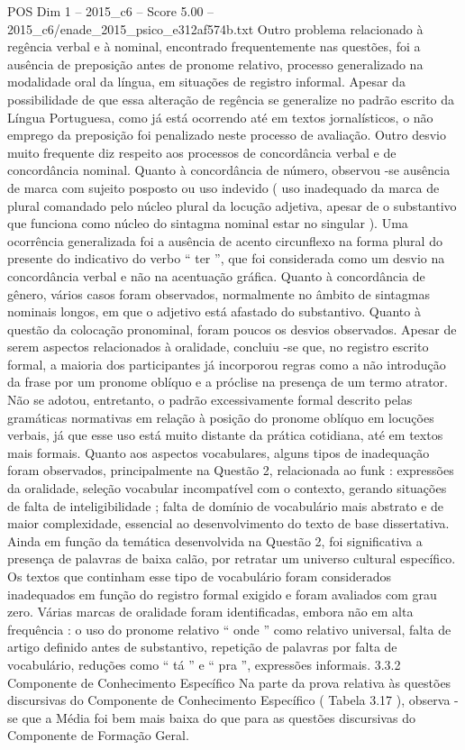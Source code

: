 \begin{textsample}{POS Dim 1 – 2015\_c6 – Score 5.00 – 2015\_c6/enade\_2015\_psico\_e312af574b.txt}
Outro problema relacionado à regência verbal e à nominal, encontrado frequentemente nas questões, foi a ausência de preposição antes de pronome relativo, processo generalizado na modalidade oral da língua, em situações de registro informal.
Apesar da possibilidade de que essa alteração de regência se generalize no padrão escrito da Língua Portuguesa, como já está ocorrendo até em textos jornalísticos, o não emprego da preposição foi penalizado neste processo de avaliação.
Outro desvio muito frequente diz respeito aos processos de concordância verbal e de concordância nominal.
Quanto à concordância de número, observou -se ausência de marca com sujeito posposto ou uso indevido ( uso inadequado da marca de plural comandado pelo núcleo plural da locução adjetiva, apesar de o substantivo que funciona como núcleo do sintagma nominal estar no singular ).
Uma ocorrência generalizada foi a ausência de acento circunflexo na forma plural do presente do indicativo do verbo “ ter ”, que foi considerada como um desvio na concordância verbal e não na acentuação gráfica.
Quanto à concordância de gênero, vários casos foram observados, normalmente no âmbito de sintagmas nominais longos, em que o adjetivo está afastado do substantivo.
Quanto à questão da colocação pronominal, foram poucos os desvios observados.
Apesar de serem aspectos relacionados à oralidade, concluiu -se que, no registro escrito formal, a maioria dos participantes já incorporou regras como a não introdução da frase por um pronome oblíquo e a próclise na presença de um termo atrator.
Não se adotou, entretanto, o padrão excessivamente formal descrito pelas gramáticas normativas em relação à posição do pronome oblíquo em locuções verbais, já que esse uso está muito distante da prática cotidiana, até em textos mais formais.
Quanto aos aspectos vocabulares, alguns tipos de inadequação foram observados, principalmente na Questão 2, relacionada ao funk : expressões da oralidade, seleção vocabular incompatível com o contexto, gerando situações de falta de inteligibilidade ; falta de domínio de vocabulário mais abstrato e de maior complexidade, essencial ao desenvolvimento do texto de base dissertativa.
Ainda em função da temática desenvolvida na Questão 2, foi significativa a presença de palavras de baixa calão, por retratar um universo cultural específico.
Os textos que continham esse tipo de vocabulário foram considerados inadequados em função do registro formal exigido e foram avaliados com grau zero.
Várias marcas de oralidade foram identificadas, embora não em alta frequência : o uso do pronome relativo “ onde ” como relativo universal, falta de artigo definido antes de substantivo, repetição de palavras por falta de vocabulário, reduções como “ tá ” e “ pra ”, expressões informais. 3.3.2 Componente de Conhecimento Específico Na parte da prova relativa às questões discursivas do Componente de Conhecimento Específico ( Tabela 3.17 ), observa -se que a Média foi bem mais baixa do que para as questões discursivas do Componente de Formação Geral.

\end{textsample}
